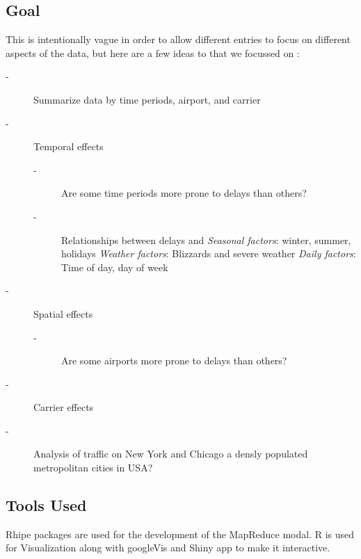 \subsection{Goal}
This is intentionally vague in order to allow different entries to focus on different aspects of the data, but here are a few ideas to that we focussed on :
\vspace*{-2mm}
\begin{description}
  \item[-] Summarize data by time periods, airport, and carrier

  \vspace*{-4mm}

  \item[-] Temporal effects
  \vspace*{-4mm}
  \begin{description}
  \item[-] Are some time periods more prone to delays than others?
  \vspace*{-3mm}
  \item[-] Relationships between delays and \textit{Seasonal factors}: winter, summer, holidays \textit{Weather factors}: Blizzards and severe weather \textit{Daily factors}: Time of day, day of week
  \end{description}
  \vspace*{-4mm}
  \item[-] Spatial effects
  \vspace*{-2mm}
  \begin{description}
  \item[-] Are some airports more prone to delays than others?
  \end{description}
  \vspace*{-2mm}
  \item[-] Carrier effects

  \vspace*{-4mm}
  \item[-] Analysis of traffic on New York and Chicago a densly populated metropolitan cities in USA?

\end{description}

\subsection{Tools Used} %
Rhipe packages are used for the development of the MapReduce modal. R is used for Visualization along with googleVis and Shiny app to make it interactive.

